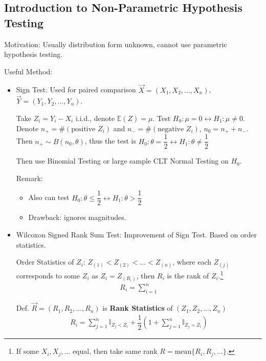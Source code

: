 \subsection{Introduction to Non-Parametric Hypothesis Testing}\label{SubSectionIntroToNonParametricHypothesisTesting}

    Motivation: Usually distribution form unknown, cannot use parametric hypothesis testing.

    Useful Method:
    \begin{itemize}
        \item Sign Test: Used for paired comparison $\vec{X}=(X_1,X_2,\ldots,X_n)$, $\vec{Y}=(Y_1,Y_2,\ldots,Y_n)$.
        
        Take $Z_i=Y_i-X_i$ i.i.d., denote $\mathbb{E}(Z)=\mu$. Test $H_0:\mu=0\longleftrightarrow H_1:\mu\neq 0$. Denote $n_+=\#(\text{positive } Z_i)$ and $n_-=\#(\text{negative }Z_i)$, $n_0=n_++n_-$. Then $n_+\sim B(n_0,\theta)$, thus the test is $H_0:\theta=\dfrac{1}{2}\longleftrightarrow H_1:\theta\neq\dfrac{1}{2}$
        
        Then use Binomial Testing or large sample CLT Normal Testing on $ H_0 $.

        Remark:
        \begin{itemize}
            \item Also can test $H_0:\theta\leq\dfrac{1}{2}\longleftrightarrow H_1:\theta>\dfrac{1}{2}$
            \item Drawback: ignores magnitudes.
        \end{itemize}
        
        \item {}Wilcoxon Signed Rank Sum Test: Improvement of Sign Test. Based on order statistics.
        
        Order Statistics of $Z_i$: $Z_{(1)}<Z_{(2)}<\ldots<Z_{(n)}$, where each $Z_{(j)}$ corresponds to some $Z_i$ as $Z_i=Z_{(R_i)}$, then $R_i$ is the rank of $Z_i$.\footnote{If some $X_i,X_j,\ldots$ equal, then take same rank $R=\mathrm{mean}\{R_i,R_j,\ldots\}$.}
        \begin{align}
            R_i=\sum_{i=1}^n 
        \end{align}
        
        
        
        Def. $\vec{R}=(R_1,R_2,\ldots,R_n)$ is \textbf{Rank Statistics} of $(Z_1,Z_2,\ldots,Z_n)$
        \begin{align}
            R_i=\sum_{j=1}^n\mathbb{I}_{Z_j<Z_i}+\dfrac{1}{2}\left(1+\sum_{j=1}^n\mathbb{I}_{Z_j=Z_i} \right)
        \end{align}
        

\end{itemize}
